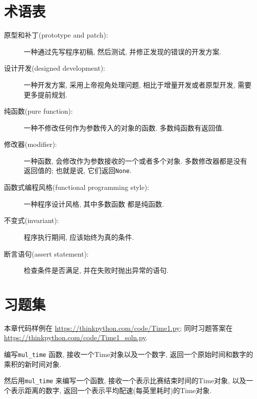 \documentclass[10pt]{book}
\begin{document}
\section{术语表}

\begin{description}

\item[原型和补丁(prototype and patch):] 一种通过先写程序初稿, 然后测试, 并修正发现的错误的开发方案. 

\item[设计开发(designed development):] 一种开发方案, 采用上帝视角处理问题, 
相比于增量开发或者原型开发, 需要更多提前规划. 

\item[纯函数(pure function):] 一种不修改任何作为参数传入的对象的函数. 
多数纯函数有返回值. 

\item[修改器(modifier):] 一种函数, 
会修改作为参数接收的一个或者多个对象. 
多数修改器都是没有返回值的;
也就是说, 它们返回{\tt None}. 

\item[函数式编程风格(functional programming style):] 一种程序设计风格, 其中多数函数
都是纯函数.

\item[不变式(invariant):] 程序执行期间, 应该始终为真的条件. 

\item[断言语句(assert statement):] 检查条件是否满足, 并在失败时抛出异常的语句. 

\end{description}


\section{习题集}

本章代码样例在
\url{https://thinkpython.com/code/Time1.py}; 
同时习题答案在\url{https://thinkpython.com/code/Time1_soln.py}.

\begin{exercise}

编写\verb"mul_time" 函数, 接收一个Time对象以及一个数字, 
返回一个原始时间和数字的乘积的新时间对象. 

然后用\verb"mul_time" 来编写一个函数, 接收一个表示比赛结束时间的Time对象, 
以及一个表示距离的数字, 返回一个表示平均配速(每英里耗时)的Time对象. 

\end{exercise}
\end{document}
